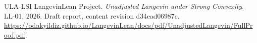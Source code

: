 \documentclass[11pt,a4paper]{article}
\begin{document}
\begin{thebibliography}{ULA-LSI}
LangevinLean Project. \emph{Unadjusted Langevin under Strong Convexity}. LL-01, 2026. Draft report, content revision d34ead06987c. \url{https://odakyildiz.github.io/LangevinLean/docs/pdf/UnadjustedLangevin/FullProof.pdf}.
\end{thebibliography}
\end{document}
